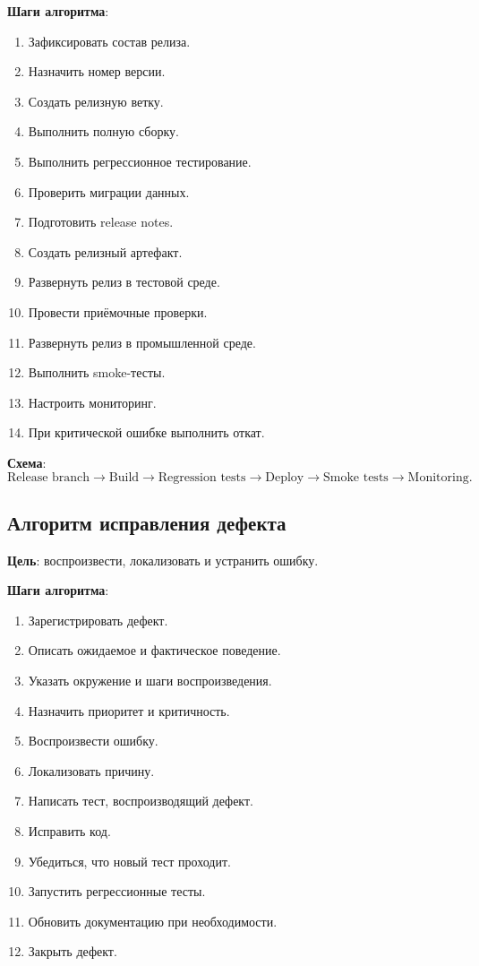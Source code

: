 \documentclass[12pt,a4paper]{article}
\begin{document}
\textbf{Шаги алгоритма}:
\begin{enumerate}
    \item Зафиксировать состав релиза.
    \item Назначить номер версии.
    \item Создать релизную ветку.
    \item Выполнить полную сборку.
    \item Выполнить регрессионное тестирование.
    \item Проверить миграции данных.
    \item Подготовить release notes.
    \item Создать релизный артефакт.
    \item Развернуть релиз в тестовой среде.
    \item Провести приёмочные проверки.
    \item Развернуть релиз в промышленной среде.
    \item Выполнить smoke-тесты.
    \item Настроить мониторинг.
    \item При критической ошибке выполнить откат.
\end{enumerate}

\textbf{Схема}:
\[
\text{Release branch}
\rightarrow
\text{Build}
\rightarrow
\text{Regression tests}
\rightarrow
\text{Deploy}
\rightarrow
\text{Smoke tests}
\rightarrow
\text{Monitoring}.
\]

\subsection{Алгоритм исправления дефекта}

\textbf{Цель}: воспроизвести, локализовать и устранить ошибку.

\textbf{Шаги алгоритма}:
\begin{enumerate}
    \item Зарегистрировать дефект.
    \item Описать ожидаемое и фактическое поведение.
    \item Указать окружение и шаги воспроизведения.
    \item Назначить приоритет и критичность.
    \item Воспроизвести ошибку.
    \item Локализовать причину.
    \item Написать тест, воспроизводящий дефект.
    \item Исправить код.
    \item Убедиться, что новый тест проходит.
    \item Запустить регрессионные тесты.
    \item Обновить документацию при необходимости.
    \item Закрыть дефект.
\end{enumerate}
\end{document}
